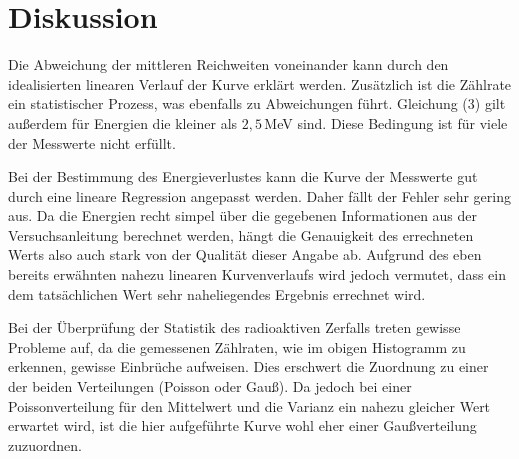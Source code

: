 \section{Diskussion}
\label{sec:Diskussion}

Die Abweichung der mittleren Reichweiten voneinander kann durch den idealisierten linearen Verlauf der Kurve erklärt werden. Zusätzlich ist
die Zählrate ein statistischer Prozess, was ebenfalls zu Abweichungen führt. Gleichung (3) gilt außerdem für Energien die kleiner als
$2,5\,$MeV sind. Diese Bedingung ist für viele der Messwerte nicht erfüllt.

Bei der Bestimmung des Energieverlustes kann die Kurve der Messwerte gut durch eine lineare Regression angepasst werden. Daher fällt der Fehler
sehr gering aus. Da die Energien recht simpel über die gegebenen Informationen aus der Versuchsanleitung \cite{sample} berechnet werden, hängt
die Genauigkeit des errechneten Werts also auch stark von der Qualität dieser Angabe ab. Aufgrund des eben bereits erwähnten nahezu linearen
Kurvenverlaufs wird jedoch vermutet, dass ein dem tatsächlichen Wert sehr naheliegendes Ergebnis errechnet wird.

Bei der Überprüfung der Statistik des radioaktiven Zerfalls treten gewisse Probleme auf, da die gemessenen Zählraten, wie im obigen Histogramm zu
erkennen, gewisse Einbrüche aufweisen. Dies erschwert die Zuordnung zu einer der beiden Verteilungen (Poisson oder Gauß). Da jedoch bei einer
Poissonverteilung für den Mittelwert und die Varianz ein nahezu gleicher Wert erwartet wird, ist die hier aufgeführte Kurve wohl eher einer
Gaußverteilung zuzuordnen.
